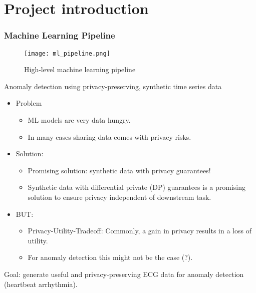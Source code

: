 \section{Project introduction}

\begin{frame}
    \frametitle{Machine Learning Pipeline}
    \begin{figure}[h]
        \centering
        \texttt{[image: ml\_pipeline.png]}
         \caption{High-level machine learning pipeline}
    \end{figure}
\end{frame}

\begin{frame}{Anomaly detection using privacy-preserving, synthetic time series data}
    
    \begin{itemize}
        \item Problem
        \begin{itemize}
            \item ML models are very data hungry.
            \item In many cases sharing data comes with privacy risks.
        \end{itemize}
        \item Solution:
        \begin{itemize}
            \item Promising solution: \alert{synthetic data} with privacy guarantees!
            \item Synthetic data with \alert{differential private} (DP) guarantees is a promising solution to ensure privacy independent of downstream task.
        \end{itemize}
        \item BUT:
        \begin{itemize}
            \item \alert{Privacy-Utility-Tradeoff}: Commonly, a gain in privacy results in a loss of utility. 
            \item For \alert{anomaly detection} this might not be the case (?).
        \end{itemize}
    \end{itemize}
    Goal: generate useful and privacy-preserving ECG data for anomaly detection (heartbeat arrhythmia).
\end{frame}


